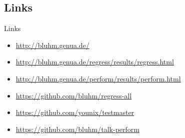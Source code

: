 \documentclass[14pt,aspectratio=169]{beamer}
\begin{document}
\subsection{Links}
\begin{frame}{Links}
\begin{itemize}
    \small
    \item \url{http://bluhm.genua.de/}
    \item \url{http://bluhm.genua.de/regress/results/regress.html}
    \item \url{http://bluhm.genua.de/perform/results/perform.html}
    \item \url{https://github.com/bluhm/regress-all}
    \item \url{https://github.com/younix/testmaster}
    \item \url{https://github.com/bluhm/talk-perform}
\end{itemize}
\end{frame}
\end{document}

